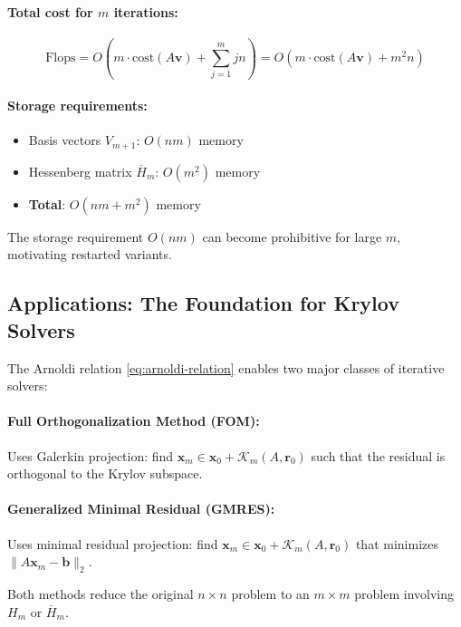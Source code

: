 \documentclass[../../main.tex]{subfiles}
\begin{document}
\paragraph{Total cost for $m$ iterations:}
\[
  \text{Flops} = O\left(m \cdot \text{cost}(A\mathbf{v}) + \sum_{j=1}^m jn\right) = O(m \cdot \text{cost}(A\mathbf{v}) + m^2n)
\]

\paragraph{Storage requirements:}
\begin{itemize}
  \item Basis vectors $V_{m+1}$: $O(nm)$ memory
  \item Hessenberg matrix $\overline{H}_m$: $O(m^2)$ memory
  \item \textbf{Total}: $O(nm + m^2)$ memory
\end{itemize}

The storage requirement $O(nm)$ can become prohibitive for large $m$, motivating restarted variants.

\subsection{Applications: The Foundation for Krylov Solvers}

The Arnoldi relation \eqref{eq:arnoldi-relation} enables two major classes of iterative solvers:

\paragraph{Full Orthogonalization Method (FOM):}
Uses Galerkin projection: find $\mathbf{x}_m \in \mathbf{x}_0 + \mathcal{K}_m(A,\mathbf{r}_0)$ such that the residual is orthogonal to the Krylov subspace.

\paragraph{Generalized Minimal Residual (GMRES):}
Uses minimal residual projection: find $\mathbf{x}_m \in \mathbf{x}_0 + \mathcal{K}_m(A,\mathbf{r}_0)$ that minimizes $\|A\mathbf{x}_m - \mathbf{b}\|_2$.

Both methods reduce the original $n \times n$ problem to an $m \times m$ problem involving $H_m$ or $\overline{H}_m$.
\end{document}
